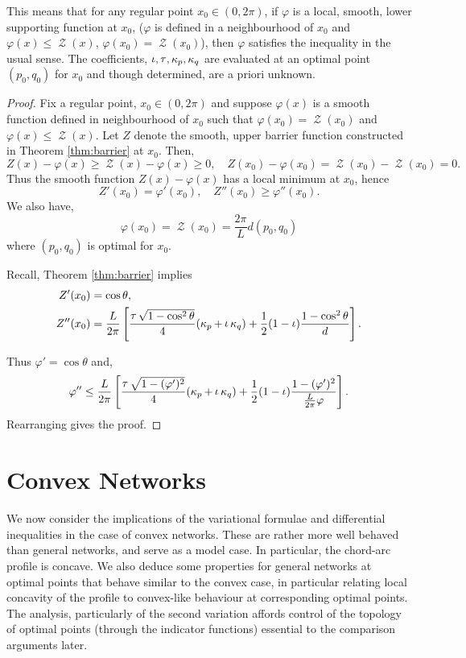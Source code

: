 \documentclass[11pt]{amsart}
\DeclareMathOperator{\chordarcprofile}{\mathcal{Z}}
\DeclareMathOperator{\tangindicator}{\iota}
\DeclareMathOperator{\norindicator}{\tau}
\begin{document}
This means that for any regular point \(x_0 \in (0,2\pi)\), if \(\varphi\) is a local, smooth, lower supporting function at \(x_0\), (\(\varphi\) is defined in a neighbourhood of \(x_0\) and \(\varphi(x) \leq \chordarcprofile (x)\), \(\varphi(x_0) = \chordarcprofile (x_0)\)), then \(\varphi\) satisfies the inequality in the usual sense. The coefficients, \(\tangindicator, \norindicator, \curvecurv_p, \curvecurv_q\) are evaluated at an optimal point \((p_0, q_0)\) for \(x_0\) and though determined, are a priori unknown.

\begin{proof}
Fix a regular point, $x_0 \in (0,2\pi)$ and suppose $\varphi(x)$ is a smooth function defined in neighbourhood of $x_0$ such that $\varphi(x_0) = \chordarcprofile(x_0)$ and $\varphi(x) \leq \chordarcprofile(x)$. Let \(Z\) denote the smooth, upper barrier function constructed in Theorem \ref{thm:barrier} at \(x_0\). Then,
\[
Z(x) - \varphi(x) \geq \chordarcprofile(x) - \varphi(x) \geq 0, \quad Z(x_0) - \varphi(x_0) = \chordarcprofile(x_0) - \chordarcprofile(x_0) = 0.
\]
Thus the smooth function \(Z(x) - \varphi(x)\) has a local minimum at \(x_0\), hence
\[
Z'(x_0) = \varphi'(x_0), \quad Z''(x_0) \geq \varphi''(x_0).
\]
We also have,
\[
\varphi(x_0) = \chordarcprofile(x_0) = \frac{2\pi}{L} d(p_0, q_0)
\]
where \((p_0, q_0)\) is optimal for \(x_0\).

Recall, Theorem \ref{thm:barrier} implies
\begin{align*}
Z'(x_0) &= \cos \theta, \\
Z''(x_0) &= \frac{L}{2\pi}\left[\frac{\norindicator\sqrt{1-\cos^2\theta}}{4} (\curvecurv_p + \tangindicator\curvecurv_q) + \frac{1}{2} (1-\tangindicator) \frac{1-\cos^2\theta}{d}\right].
\end{align*}

Thus \(\varphi' = \cos \theta\) and,
\[
\varphi'' \leq \frac{L}{2\pi}\left[\frac{\norindicator\sqrt{1-(\varphi')^2}}{4} (\curvecurv_p + \tangindicator\curvecurv_q) + \frac{1}{2} (1-\tangindicator) \frac{1-(\varphi')^2}{\tfrac{L}{2\pi} \varphi}\right].
\]
Rearranging gives the proof.
\end{proof}

\section{Convex Networks}

We now consider the implications of the variational formulae and differential inequalities in the case of convex networks. These are rather more well behaved than general networks, and serve as a model case. In particular, the chord-arc profile is concave. We also deduce some properties for general networks at optimal points that behave similar to the convex case, in particular relating local concavity of the profile to convex-like behaviour at corresponding optimal points. The analysis, particularly of the second variation affords control of the topology of optimal points (through the indicator functions) essential to the comparison arguments later.
\end{document}
